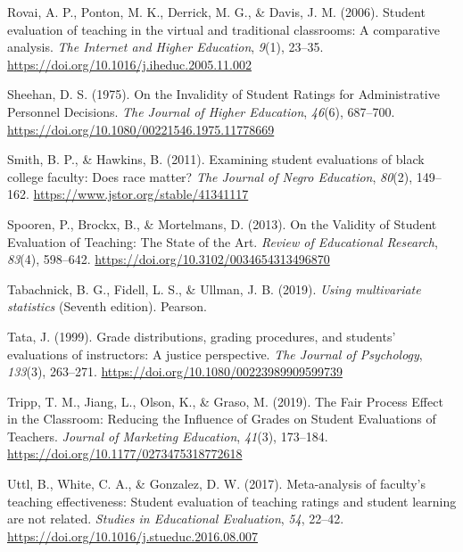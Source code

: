 \documentclass[
  man]{apa7}
\newlength{\cslhangindent}
\newlength{\cslentryspacingunit} %
\newenvironment{CSLReferences}[2] %
 {%
  \setlength{\parindent}{0pt}
  \ifodd #1
  \let\oldpar\par
  \def\par{\hangindent=\cslhangindent\oldpar}
  \fi
  \setlength{\parskip}{#2\cslentryspacingunit}
 }%
 {}
\begin{document}
\begin{CSLReferences}{1}{0}
\leavevmode{}%
Rovai, A. P., Ponton, M. K., Derrick, M. G., \& Davis, J. M. (2006). Student evaluation of teaching in the virtual and traditional classrooms: A comparative analysis. \emph{The Internet and Higher Education}, \emph{9}(1), 23--35. \url{https://doi.org/10.1016/j.iheduc.2005.11.002}

\leavevmode{}%
Sheehan, D. S. (1975). On the Invalidity of Student Ratings for Administrative Personnel Decisions. \emph{The Journal of Higher Education}, \emph{46}(6), 687--700. \url{https://doi.org/10.1080/00221546.1975.11778669}

\leavevmode{}%
Smith, B. P., \& Hawkins, B. (2011). Examining student evaluations of black college faculty: Does race matter? \emph{The Journal of Negro Education}, \emph{80}(2), 149--162. \url{https://www.jstor.org/stable/41341117}

\leavevmode{}%
Spooren, P., Brockx, B., \& Mortelmans, D. (2013). On the Validity of Student Evaluation of Teaching: The State of the Art. \emph{Review of Educational Research}, \emph{83}(4), 598--642. \url{https://doi.org/10.3102/0034654313496870}

\leavevmode{}%
Tabachnick, B. G., Fidell, L. S., \& Ullman, J. B. (2019). \emph{Using multivariate statistics} (Seventh edition). Pearson.

\leavevmode{}%
Tata, J. (1999). Grade distributions, grading procedures, and students' evaluations of instructors: A justice perspective. \emph{The Journal of Psychology}, \emph{133}(3), 263--271. \url{https://doi.org/10.1080/00223989909599739}

\leavevmode{}%
Tripp, T. M., Jiang, L., Olson, K., \& Graso, M. (2019). The Fair Process Effect in the Classroom: Reducing the Influence of Grades on Student Evaluations of Teachers. \emph{Journal of Marketing Education}, \emph{41}(3), 173--184. \url{https://doi.org/10.1177/0273475318772618}

\leavevmode{}%
Uttl, B., White, C. A., \& Gonzalez, D. W. (2017). Meta-analysis of faculty's teaching effectiveness: Student evaluation of teaching ratings and student learning are not related. \emph{Studies in Educational Evaluation}, \emph{54}, 22--42. \url{https://doi.org/10.1016/j.stueduc.2016.08.007}


\end{CSLReferences}
\end{document}
